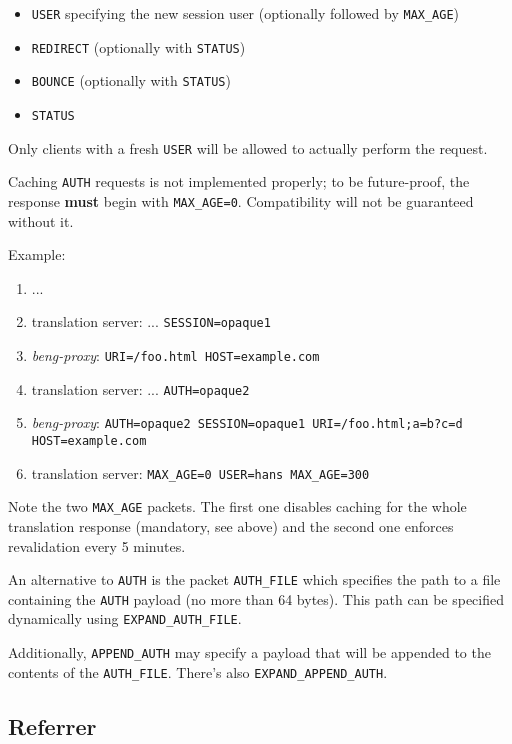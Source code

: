 \documentclass[a4paper,12pt]{article}
\begin{document}
\begin{itemize}
\item \texttt{USER} specifying the new session user (optionally
  followed by \verb|MAX_AGE|)
\item \texttt{REDIRECT} (optionally with \texttt{STATUS})
\item \texttt{BOUNCE} (optionally with \texttt{STATUS})
\item \texttt{STATUS}
\end{itemize}

Only clients with a fresh \texttt{USER} will be allowed to actually
perform the request.

Caching \texttt{AUTH} requests is not implemented properly; to be
future-proof, the response \textbf{must} begin with \verb|MAX_AGE=0|.
Compatibility will not be guaranteed without it.

Example:

\begin{enumerate}
\item ...
\item translation server: ... \texttt{SESSION=opaque1}
\item \emph{beng-proxy}: \texttt{URI=/foo.html HOST=example.com}
\item translation server: ... \texttt{AUTH=opaque2}
\item \emph{beng-proxy}: \texttt{AUTH=opaque2 SESSION=opaque1 URI=/foo.html;a=b?c=d HOST=example.com}
\item translation server: \texttt{MAX\_AGE=0 USER=hans MAX\_AGE=300}
\end{enumerate}

Note the two \verb|MAX_AGE| packets.  The first one disables caching
for the whole translation response (mandatory, see above) and the
second one enforces revalidation every 5 minutes.

An alternative to \verb|AUTH| is the packet \verb|AUTH_FILE| which
specifies the path to a file containing the \verb|AUTH| payload (no
more than 64 bytes).  This path can be specified dynamically using
\verb|EXPAND_AUTH_FILE|.

Additionally, \verb|APPEND_AUTH| may specify a payload that will be
appended to the contents of the \verb|AUTH_FILE|.  There's also
\verb|EXPAND_APPEND_AUTH|.


\subsection{Referrer}
\end{document}
